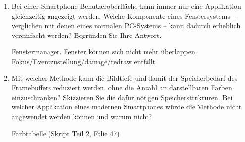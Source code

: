 
\begin{enumerate}

\item Bei einer Smartphone-Benutzeroberfläche kann immer nur eine Applikation
gleichzeitig angezeigt werden. Welche Komponente eines Fenstersystems --
verglichen mit denen eines normalen PC-Systems -- kann dadurch erheblich vereinfacht
werden? Begründen Sie Ihre Antwort.

\begin{solution}{5}
Fenstermanager. Fenster können sich nicht mehr überlappen,
Fokus/Eventzustellung/damage/redraw entfällt 
\end{solution}

\item Mit welcher Methode kann die Bildtiefe und damit der Speicherbedarf des
Framebuffers reduziert werden, ohne die Anzahl an darstellbaren Farben
einzuschränken? Skizzieren Sie die dafür nötigen Speicherstrukturen. Bei welcher
Applikation eines modernen Smartphones würde die Methode nicht angewendet werden
können und warum nicht?

\begin{solution}{3}
Farbtabelle (Skript Teil 2, Folie 47)
\end{solution}

\end{enumerate}
